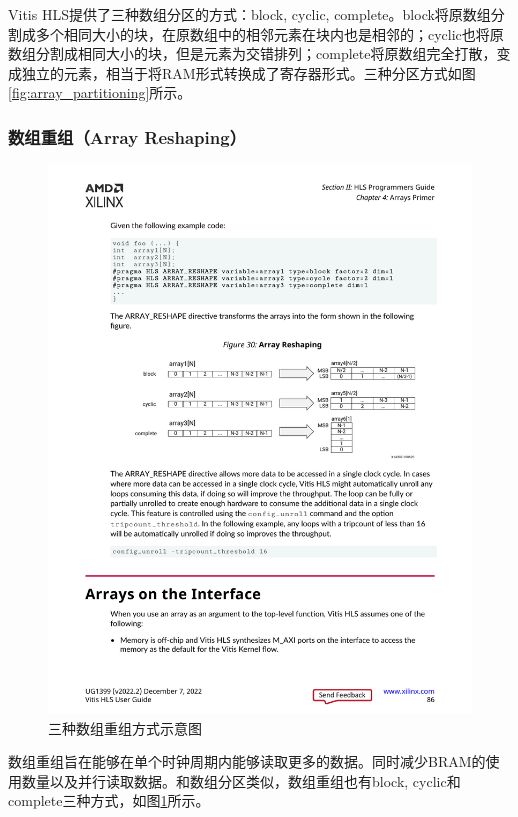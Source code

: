 Vitis HLS提供了三种数组分区的方式：block, cyclic, complete。block将原数组分割成多个相同大小的块，在原数组中的相邻元素在块内也是相邻的；cyclic也将原数组分割成相同大小的块，但是元素为交错排列；complete将原数组完全打散，变成独立的元素，相当于将RAM形式转换成了寄存器形式。三种分区方式如图\ref{fig:array_partitioning}所示。

\subsubsection{数组重组（Array Reshaping）}
\begin{figure}[htbp]
    \centering
    \includegraphics[width=\linewidth]{figures/array_reshaping.pdf}
    \caption{三种数组重组方式示意图}
    \label{fig:array_reshaping}
\end{figure}

数组重组旨在能够在单个时钟周期内能够读取更多的数据。同时减少BRAM的使用数量以及并行读取数据\cite{noauthor_vitis_2022}。和数组分区类似，数组重组也有block, cyclic和complete三种方式，如图\ref{fig:array_reshaping}所示。




